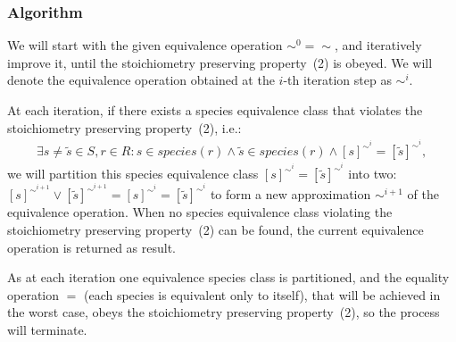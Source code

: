 \documentclass[10pt]{bmc_article}
\newenvironment{bmcformat}{\baselineskip20pt\sloppy\setboolean{publ}{false}}{\baselineskip20pt\sloppy}
\begin{document}
\begin{bmcformat}
\subsubsection*{Algorithm}
We will start with the given equivalence operation $\sim^0 = \sim$, and iteratively improve it, until the stoichiometry preserving property~(2) is obeyed. We will denote the equivalence operation obtained at the $i$-th iteration step as $\sim^i$.

At each iteration, if there exists a species equivalence class that violates the stoichiometry preserving property~(2), i.e.:
\begin{align*}
\exists s \neq \tilde{s} \in S, r \in R: s \in species(r) \land \tilde{s} \in species(r) \land  [s]^{{\sim}^i} = [\tilde{s}]^{{\sim}^i},
\end{align*}
we will partition this species equivalence class $[s]^{{\sim}^i} = [\tilde{s}]^{{\sim}^i}$ into two: $[s]^{{\sim}^{i+1}}  \vee [\tilde{s}]^{{\sim}^{i+1}}  = [s]^{{\sim}^i} = [\tilde{s}]^{{\sim}^i} $ to form a new approximation ${\sim}^{i+1}$ of the equivalence operation. When no species equivalence class violating the stoichiometry preserving property~(2) can be found, the current equivalence operation is returned as result.

As at each iteration one equivalence species class is partitioned, and the equality operation $=$ (each species is equivalent only to itself), that will be achieved in the worst case, obeys the stoichiometry preserving property~(2), so the process will terminate. \\



\end{bmcformat}
\end{document}
